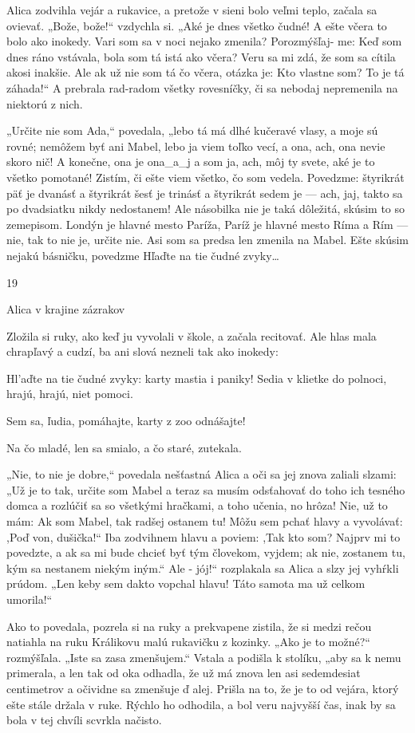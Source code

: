 \documentclass[12pt]{article}
\begin{document}
\begin{Parallel}[p]{}{}
{Alica zodvihla vejár a rukavice, a pretože v sieni bolo
veľmi teplo, začala sa ovievať. „Bože, bože!“ vzdychla si.
„Aké je dnes všetko čudné! A ešte včera to bolo ako
inokedy. Vari som sa v noci nejako zmenila? Porozmýšľaj-
me: Keď som dnes ráno vstávala, bola som tá istá ako včera?
Veru sa mi zdá, že som sa cítila akosi inakšie. Ale ak už nie
som tá čo včera, otázka je: Kto vlastne som? To je tá
záhada!“ A prebrala rad-radom všetky rovesníčky, či sa
nebodaj nepremenila na niektorú z nich.

„Určite nie som Ada,“ povedala, „lebo tá má dlhé
kučeravé vlasy, a moje sú rovné; nemôžem byť ani Mabel,
lebo ja viem toľko vecí, a ona, ach, ona nevie skoro nič!
A konečne, ona je ona_a_j a som ja, ach, môj ty svete, aké je to
všetko pomotané! Zistím, či ešte viem všetko, čo som
vedela. Povedzme: štyrikrát päť je dvanásť a štyrikrát šesť je
trinásť a štyrikrát sedem je — ach, jaj, takto sa po dvadsiatku
nikdy nedostanem! Ale násobilka nie je taká dôležitá,
skúsim to so zemepisom. Londýn je hlavné mesto Paríža,
Paríž je hlavné mesto Ríma a Rím — nie, tak to nie je, určite
nie. Asi som sa predsa len zmenila na Mabel. Ešte skúsim
nejakú básničku, povedzme Hľaďte na tie čudné zvyky…

19

Alica v krajine zázrakov

Zložila si ruky, ako keď ju vyvolali v škole, a začala
recitovať. Ale hlas mala chrapľavý a cudzí, ba ani slová
nezneli tak ako inokedy:

Hl'aďte na tie čudné zvyky:
karty mastia i paniky!
Sedia v klietke do polnoci,
hrajú, hrajú, niet pomoci.

Sem sa, ľudia, pomáhajte,
karty z zoo odnášajte!

Na čo mladé, len sa smialo,
a čo staré, zutekala.

„Nie, to nie je dobre,“ povedala nešťastná Alica a oči sa
jej znova zaliali slzami: „Už je to tak, určite som Mabel
a teraz sa musím odsťahovať do toho ich tesného domca
a rozlúčiť sa so všetkými hračkami, a toho učenia, no hrôza!
Nie, už to mám: Ak som Mabel, tak radšej ostanem tu!
Môžu sem pchať hlavy a vyvolávať: ,Poď von, dušička!“ Iba
zodvihnem hlavu a poviem: ,Tak kto som? Najprv mi to
povedzte, a ak sa mi bude chcieť byť tým človekom, vyjdem;
ak nie, zostanem tu, kým sa nestanem niekým iným.“ Ale
- jój!“ rozplakala sa Alica a slzy jej vyhŕkli prúdom. „Len
keby sem dakto vopchal hlavu! Táto samota ma už celkom
umorila!“

Ako to povedala, pozrela si na ruky a prekvapene zistila,
že si medzi rečou natiahla na ruku Králikovu malú rukavičku
z kozinky. „Ako je to možné?“ rozmýšľala. „Iste sa zasa
zmenšujem.“ Vstala a podišla k stolíku, „aby sa k nemu
primerala, a len tak od oka odhadla, že už má znova len asi
sedemdesiat centimetrov a očividne sa zmenšuje ď alej.
Prišla na to, že je to od vejára, ktorý ešte stále držala v ruke.
Rýchlo ho odhodila, a bol veru najvyšší čas, inak by sa bola
v tej chvíli scvrkla načisto.

}
\end{Parallel}
\end{document}
